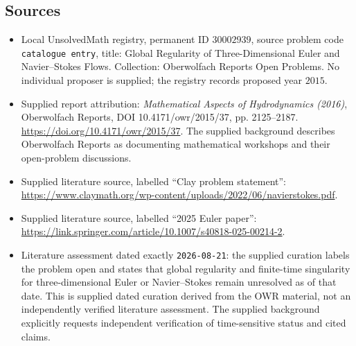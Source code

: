 \documentclass[11pt]{article}
\begin{document}
\subsection{Sources}
\begin{itemize}
\item Local UnsolvedMath registry, permanent ID \(30002939\), source problem code \texttt{catalogue entry}, title: Global Regularity of Three-Dimensional Euler and Navier--Stokes Flows. Collection: Oberwolfach Reports Open Problems. No individual proposer is supplied; the registry records proposed year \(2015\).
\item Supplied report attribution: \emph{Mathematical Aspects of Hydrodynamics (2016)}, Oberwolfach Reports, DOI 10.4171/owr/2015/37, pp. 2125--2187. \url{https://doi.org/10.4171/owr/2015/37}. The supplied background describes Oberwolfach Reports as documenting mathematical workshops and their open-problem discussions.
\item Supplied literature source, labelled ``Clay problem statement'': \url{https://www.claymath.org/wp-content/uploads/2022/06/navierstokes.pdf}.
\item Supplied literature source, labelled ``2025 Euler paper'': \url{https://link.springer.com/article/10.1007/s40818-025-00214-2}.
\item Literature assessment dated exactly \texttt{2026-08-21}: the supplied curation labels the problem open and states that global regularity and finite-time singularity for three-dimensional Euler or Navier--Stokes remain unresolved as of that date. This is supplied dated curation derived from the OWR material, not an independently verified literature assessment. The supplied background explicitly requests independent verification of time-sensitive status and cited claims.
\end{itemize}
\end{document}
